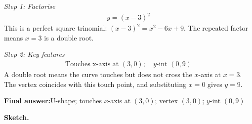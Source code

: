 \documentclass[11pt]{article}
\begin{document}
\textit{Step 1: Factorise}
\[\begin{gathered}
y = (x-3)^2
\end{gathered}\]
This is a perfect square trinomial: \( (x-3)^2 = x^2 - 6x + 9 \). The repeated factor means \( x = 3 \) is a double root.

\textit{Step 2: Key features}
\[\begin{gathered}
\text{Touches x-axis at } (3,0); \quad y\text{-int } (0,9)
\end{gathered}\]
A double root means the curve touches but does not cross the \( x \)-axis at \( x = 3 \). The vertex coincides with this touch point, and substituting \( x = 0 \) gives \( y = 9 \).

\begin{answerbox}
\textbf{Final answer:}\quad U-shape; touches \(\displaystyle x\)-axis at \(\displaystyle (3,0)\); vertex \(\displaystyle (3,0)\); \(\displaystyle y\)-int \(\displaystyle (0,9)\)
\end{answerbox}
\textbf{Sketch.}
\end{document}
